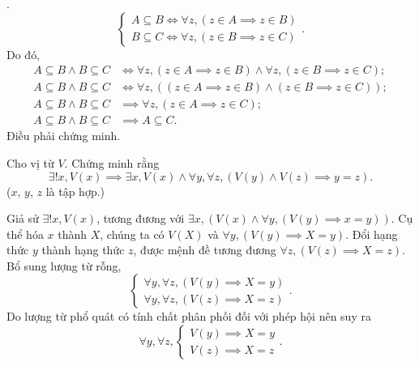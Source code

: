 .
\begin{equation*}
   \begin{cases}
      A \subseteq B \iff \forall z, (z \in A \implies z \in B) \\
      B \subseteq C \iff \forall z, (z \in B \implies z \in C)
   \end{cases}.
\end{equation*}
Do đó,
\begin{align*}
   A \subseteq B \land B \subseteq C & \iff \forall z, (z \in A \implies z \in B) \land \forall z, (z \in B \implies z \in C);    \\
   A \subseteq B \land B \subseteq C & \iff \forall z, \left( (z \in A \implies z \in B) \land (z \in B \implies z \in C)\right); \\
   A \subseteq B \land B \subseteq C & \implies \forall z, \left(z \in A \implies z \in C\right);                                 \\
   A \subseteq B \land B \subseteq C & \implies A \subseteq C.
\end{align*}
Điều phải chứng minh.

\exercise Cho vị từ $V$. Chứng minh rằng 
\begin{equation*}
   \exists ! x, V(x) \implies \exists x, V(x) \land \forall y, \forall z, (V(y) \land V(z) \implies y = z).
\end{equation*}
($x$, $y$, $z$ là tập hợp.)

\solution

Giả sử $\exists ! x, V(x)$, tương đương với $\exists x, (V(x) \land \forall y, (V(y) \implies x = y))$. Cụ thể hóa $x$ thành $X$, chúng ta có $V(X)$ và $\forall y, (V(y) \implies X = y)$. Đổi hạng thức $y$ thành hạng thức $z$, được mệnh đề tương đương $\forall z, (V(z) \implies X = z)$. Bổ sung lượng từ rỗng,
\begin{equation*}
   \begin{cases}
      \forall y, \forall z, (V(y) \implies X = y) \\ 
      \forall y, \forall z, (V(z) \implies X = z)
   \end{cases}.
\end{equation*}
Do lượng từ phổ quát có tính chất phân phối đối với phép hội nên suy ra 
\begin{equation*}
   \forall y, \forall z, \begin{cases}
      V(y) \implies X = y \\
      V(z) \implies X = z
   \end{cases}.
\end{equation*}

